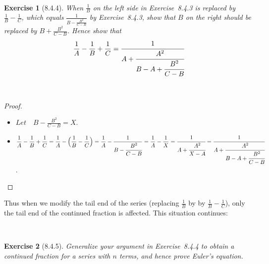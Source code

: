 \documentclass[12pt]{article}
\newcommand{\XB}{\color{black}}
\newcommand{\XBB}{\color{blue}}
\newcommand{\ds}{\displaystyle}
\theoremstyle{plain}
\newtheorem{ex}{Exercise}
\begin{document}
\XBB\hrulefill\XB \\
\begin{ex} [8.4.4]
  When $ \frac{1}{B} $ on the left side in Exercise~8.4.3 is replaced by $ \frac{1}{B} - \frac{1}{C} $, 
  which equals $ \frac{1}{B - \frac{B^{2}}{C - B}} $ by Exercise~8.4.3, show that $ B $ on the right should be replaced by $ B + \frac{B^{2}}{C - B} $. Hence show that
  \[
    \frac{1}{A} - \frac{1}{B} + \frac{1}{C} = \cfrac{1}{A + \cfrac{A^{2}}{B - A + \cfrac{B^{2}}{C - B}}}
  \]
\end{ex}
\XBB\hrulefill\XB \\

\begin{proof}
  \ \\

  \begin{itemize}
    \item $ \ds Let \quad B - \frac{B^{2}}{C - B} = X $.
    \item $ \ds \frac{1}{A} - \frac{1}{B} + \frac{1}{C} = \frac{1}{A} - \Bigl( \frac{1}{B} - \frac{1}{C} \Bigr) = \frac{1}{A} - \frac{1}{B - \cfrac{B^{2}}{C - B}} = \frac{1}{A} - \frac{1}{X} = \cfrac{1}{A + \cfrac{A^{2}}{X - A}} = \cfrac{1}{A + \cfrac{A^{2}}{B - A + \cfrac{B^{2}}{C - B}}} $.
  \end{itemize}

\end{proof}

\newpage

Thus when we modify the tail end of the series (replacing $ \frac{1}{B} $ by by $ \frac{1}{B} - \frac{1}{C} $), only the tail end of the continued fraction is affected. This situation continues:


\XBB\hrulefill\XB \\
\begin{ex} [8.4.5]
  Generalize your argument in Exercise~8.4.4 to obtain a continued fraction for a series with $n$ terms, and hence prove Euler's equation.
\end{ex}
\XBB\hrulefill\XB \\
\end{document}
